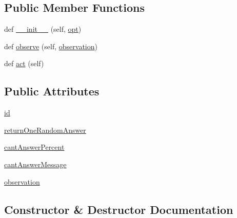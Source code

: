 \subsection*{Public Member Functions}
\begin{DoxyCompactItemize}
\item 
def \hyperlink{classShadock_1_1RepeatLabelAgent_a38d5086f0434cd05f7d6a6c22f37cf43}{\+\_\+\+\_\+init\+\_\+\+\_\+} (self, \hyperlink{classparlai_1_1core_1_1agents_1_1Agent_ab3b45d2754244608c75d4068b90cd051}{opt})
\item 
def \hyperlink{classShadock_1_1RepeatLabelAgent_ae01ff4d505267990982ec0565dccd61d}{observe} (self, \hyperlink{classShadock_1_1RepeatLabelAgent_a690dbe29c2e66b970dfd43046790f2b0}{observation})
\item 
def \hyperlink{classShadock_1_1RepeatLabelAgent_afdec22b589734f9af92ef4234df5d5a1}{act} (self)
\end{DoxyCompactItemize}
\subsection*{Public Attributes}
\begin{DoxyCompactItemize}
\item 
\hyperlink{classShadock_1_1RepeatLabelAgent_a8ea5aed24eebb67bb2eac272141e6dd7}{id}
\item 
\hyperlink{classShadock_1_1RepeatLabelAgent_af5000a81304581727384cf2546b5a238}{return\+One\+Random\+Answer}
\item 
\hyperlink{classShadock_1_1RepeatLabelAgent_af080b1e85afa6f436b169eb6b0359c4b}{cant\+Answer\+Percent}
\item 
\hyperlink{classShadock_1_1RepeatLabelAgent_ab20bd9669e8f2fe85f654e2e81456de7}{cant\+Answer\+Message}
\item 
\hyperlink{classShadock_1_1RepeatLabelAgent_a690dbe29c2e66b970dfd43046790f2b0}{observation}
\end{DoxyCompactItemize}


\subsection{Constructor \& Destructor Documentation}
\mbox{\label{classShadock_1_1RepeatLabelAgent_a38d5086f0434cd05f7d6a6c22f37cf43}} 
